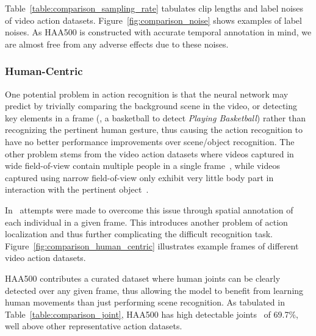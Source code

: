 \documentclass[10pt,twocolumn,letterpaper]{article}
\begin{document}
Table~\ref{table:comparison_sampling_rate} tabulates clip lengths and label noises of video action datasets. 
Figure~\ref{fig:comparison_noise} shows examples of label noises. As HAA500 is constructed with accurate temporal annotation in mind, we are almost free from any adverse effects due to these noises.

\vspace{-0.5em}
\subsubsection{Human-Centric}

One potential problem in action recognition is that the neural network may predict by trivially comparing the background scene in the video, or detecting key elements in a frame (\eg, a basketball to detect \textit{Playing Basketball}) rather than recognizing the pertinent human gesture, thus causing the action recognition to have no better performance improvements over scene/object recognition. The other problem stems from the video action datasets where videos captured in wide field-of-view contain multiple people in a single frame~\cite{AVA,kinetics400,zhao2019hacs}, while videos captured using narrow field-of-view only exhibit very little body part in interaction with the pertinent object~\cite{goyal2017something,momentsintime}. 

In~\cite{AVA} attempts were made to overcome this issue through spatial annotation of each individual in a given frame. This introduces another problem of action localization and thus further complicating the difficult recognition task. Figure~\ref{fig:comparison_human_centric} illustrates example frames of different video action datasets. 

HAA500 contributes a curated dataset where human joints can be clearly detected over any given frame, thus allowing the model to benefit from learning human movements than just performing scene recognition. As tabulated in Table~\ref{table:comparison_joint}, HAA500 has high detectable joints~\cite{alphapose} of 69.7\%, well above other representative action datasets.
\end{document}
